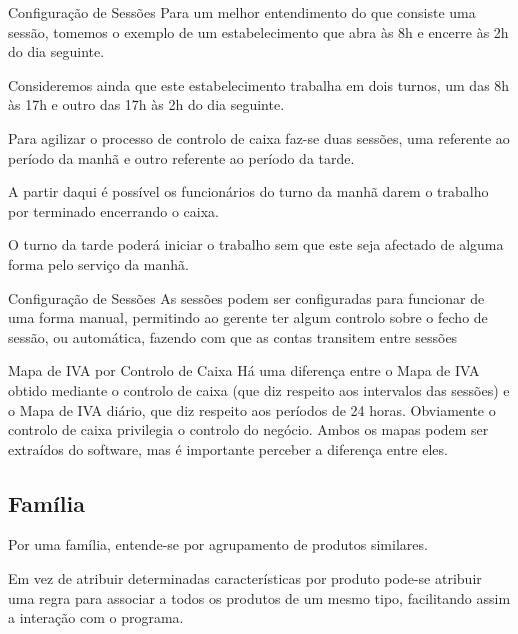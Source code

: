 \documentclass[a4paper,11pt,openany]{memoir}
\begin{document}
\begin{bclogo}[couleur=blue!10,arrondi=0.1,logo=\bccrayon,ombre=true]{Configuração de Sessões}
Para um melhor entendimento do que consiste uma sessão, tomemos o exemplo de um estabelecimento 
que abra às 8h e encerre às 2h do dia seguinte.

Consideremos ainda que este estabelecimento 
trabalha em dois turnos, um das 8h às 17h e outro das 17h às 2h do dia seguinte.

Para agilizar o processo de controlo de caixa faz-se duas sessões, uma referente ao período da manhã e outro 
referente ao período da tarde. 

A partir daqui é possível os funcionários do turno da manhã darem o trabalho por terminado encerrando o caixa. 

O turno da tarde poderá iniciar o trabalho sem que este seja afectado de alguma forma pelo serviço da manhã.
\end{bclogo}

\vspace{5mm}
\begin{bclogo}[couleur=blue!10,arrondi=0.1,logo=\bclampe,ombre=true]{Configuração de Sessões}
As sessões podem ser configuradas para funcionar de uma forma manual, permitindo ao gerente ter algum controlo
sobre o fecho de sessão, ou automática, fazendo com que as contas transitem entre sessões 
\end{bclogo}


\begin{bclogo}[couleur=blue!10,arrondi=0.1,logo=\bctakecare,ombre=true]{Mapa de IVA por Controlo de Caixa}
Há uma diferença entre o Mapa de IVA obtido mediante o controlo de caixa (que diz respeito aos intervalos das
sessões) e o Mapa de IVA diário, que diz respeito aos períodos de 24 horas. Obviamente o controlo de caixa privilegia
o controlo do negócio. Ambos os mapas podem ser extraídos do software, mas é importante perceber a diferença entre eles.
\end{bclogo}


\subsection{Família}

Por uma família, entende-se por agrupamento de produtos similares. 

Em vez de atribuir determinadas características por produto pode-se atribuir uma regra para associar a todos os produtos de um mesmo tipo, facilitando 
assim a interação com o programa.
\end{document}

